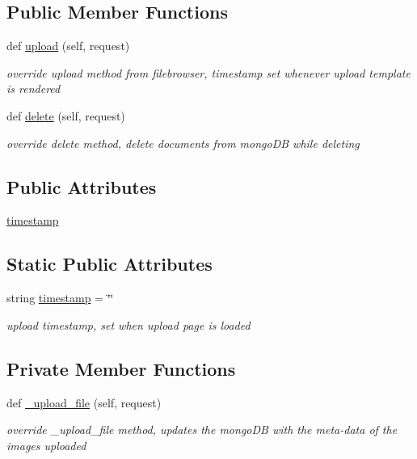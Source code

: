 \subsection*{Public Member Functions}
\begin{DoxyCompactItemize}
\item 
def \hyperlink{classimgapp_1_1filebrowser__upload_1_1userFileBrowserSite_ae8621cf07e7a542bde67af9ab97790f6}{upload} (self, request)
\begin{DoxyCompactList}\small\item\em override upload method from filebrowser, timestamp set whenever upload template is rendered \end{DoxyCompactList}\item 
def \hyperlink{classimgapp_1_1filebrowser__upload_1_1userFileBrowserSite_a847a2908ba1f3d28474de936665d823b}{delete} (self, request)
\begin{DoxyCompactList}\small\item\em override delete method, delete documents from mongo\+DB while deleting \end{DoxyCompactList}\end{DoxyCompactItemize}
\subsection*{Public Attributes}
\begin{DoxyCompactItemize}
\item 
\hyperlink{classimgapp_1_1filebrowser__upload_1_1userFileBrowserSite_a5cb7a63f6afb189b8060a533118630ef}{timestamp}
\end{DoxyCompactItemize}
\subsection*{Static Public Attributes}
\begin{DoxyCompactItemize}
\item 
string \hyperlink{classimgapp_1_1filebrowser__upload_1_1userFileBrowserSite_a540a50bf0a1b36907fc23a87a33f7f43}{timestamp} = \char`\"{}\char`\"{}
\begin{DoxyCompactList}\small\item\em upload timestamp, set when upload page is loaded \end{DoxyCompactList}\end{DoxyCompactItemize}
\subsection*{Private Member Functions}
\begin{DoxyCompactItemize}
\item 
def \hyperlink{classimgapp_1_1filebrowser__upload_1_1userFileBrowserSite_aeecdb2b8f77f56957df3bb8ab3ae6efd}{\+\_\+upload\+\_\+file} (self, request)
\begin{DoxyCompactList}\small\item\em override \+\_\+upload\+\_\+file method, updates the mongo\+DB with the meta-\/data of the images uploaded \end{DoxyCompactList}\end{DoxyCompactItemize}


